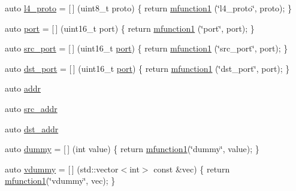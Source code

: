 \begin{DoxyCompactItemize}
\item 
auto \hyperlink{namespacepfq_1_1lang_1_1anonymous__namespace_02default_8hpp_03_a8ad2208c91dc3cd4378e715aab5fb4b7}{l4\+\_\+proto} = \mbox{[}$\,$\mbox{]} (uint8\+\_\+t proto) \{ return \hyperlink{namespacepfq_1_1lang_a68d775c68562fbd0ab9ef213f2519499}{mfunction1} (\char`\"{}l4\+\_\+proto\char`\"{}, proto); \}
\item 
auto \hyperlink{namespacepfq_1_1lang_1_1anonymous__namespace_02default_8hpp_03_a868eca03290a037cb4e9b7075085888b}{port} = \mbox{[}$\,$\mbox{]} (uint16\+\_\+t port) \{ return \hyperlink{namespacepfq_1_1lang_a68d775c68562fbd0ab9ef213f2519499}{mfunction1} (\char`\"{}port\char`\"{}, port); \}
\item 
auto \hyperlink{namespacepfq_1_1lang_1_1anonymous__namespace_02default_8hpp_03_ad1645151270994a4f396565b70233b73}{src\+\_\+port} = \mbox{[}$\,$\mbox{]} (uint16\+\_\+t \hyperlink{namespacepfq_1_1lang_1_1anonymous__namespace_02default_8hpp_03_a868eca03290a037cb4e9b7075085888b}{port}) \{ return \hyperlink{namespacepfq_1_1lang_a68d775c68562fbd0ab9ef213f2519499}{mfunction1} (\char`\"{}src\+\_\+port\char`\"{}, port); \}
\item 
auto \hyperlink{namespacepfq_1_1lang_1_1anonymous__namespace_02default_8hpp_03_a25a3b35caf255c109a6c5b4f601b1b61}{dst\+\_\+port} = \mbox{[}$\,$\mbox{]} (uint16\+\_\+t \hyperlink{namespacepfq_1_1lang_1_1anonymous__namespace_02default_8hpp_03_a868eca03290a037cb4e9b7075085888b}{port}) \{ return \hyperlink{namespacepfq_1_1lang_a68d775c68562fbd0ab9ef213f2519499}{mfunction1} (\char`\"{}dst\+\_\+port\char`\"{}, port); \}
\item 
auto \hyperlink{namespacepfq_1_1lang_1_1anonymous__namespace_02default_8hpp_03_a13cabe468839119d8d68540e3c60718b}{addr}
\item 
auto \hyperlink{namespacepfq_1_1lang_1_1anonymous__namespace_02default_8hpp_03_a2ee09b5a65a64d60bc797b2ecd1c8a4a}{src\+\_\+addr}
\item 
auto \hyperlink{namespacepfq_1_1lang_1_1anonymous__namespace_02default_8hpp_03_a3f51de44baa33ff19a94995945636072}{dst\+\_\+addr}
\item 
auto \hyperlink{namespacepfq_1_1lang_1_1anonymous__namespace_02default_8hpp_03_ab1a38555cb05c81863153fa6113395e3}{dummy} = \mbox{[}$\,$\mbox{]} (int value) \{ return \hyperlink{namespacepfq_1_1lang_a68d775c68562fbd0ab9ef213f2519499}{mfunction1}(\char`\"{}dummy\char`\"{}, value); \}
\item 
auto \hyperlink{namespacepfq_1_1lang_1_1anonymous__namespace_02default_8hpp_03_a5903cd45f9167fd8c2b0080c0afed6e5}{vdummy} = \mbox{[}$\,$\mbox{]} (std\+::vector$<$int$>$ const \&vec) \{ return \hyperlink{namespacepfq_1_1lang_a68d775c68562fbd0ab9ef213f2519499}{mfunction1}(\char`\"{}vdummy\char`\"{}, vec); \}

\end{DoxyCompactItemize}
